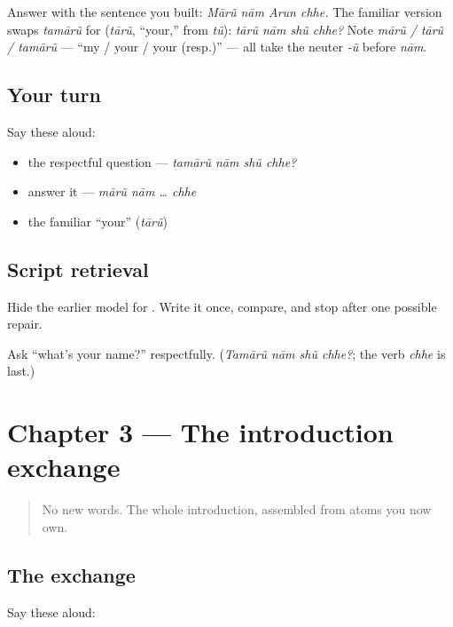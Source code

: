 \begin{grammarlens}[title={Grammar Lens: answering, and the familiar form}]
Answer with the sentence you built: \emph{Mārũ nām Arun chhe.} The familiar version swaps \emph{tamārũ} for \textbf{} (\emph{tārũ}, \textquotedblleft{}your,\textquotedblright{} from \emph{tũ}): \emph{tārũ nām shũ chhe?} Note \emph{mārũ / tārũ / tamārũ} — \textquotedblleft{}my / your / your (resp.)\textquotedblright{} — all take the neuter \emph{-ũ} before \emph{nām}.
\end{grammarlens}

\subsection*{Your turn}
Say these aloud:

\begin{itemize}
\raggedright
  \item the respectful question — \emph{tamārũ nām shũ chhe?}
  \item answer it — \emph{mārũ nām … chhe}
  \item the familiar \textquotedblleft{}your\textquotedblright{} (\emph{tārũ})
\end{itemize}

\subsection*{Script retrieval}
Hide the earlier model for \textbf{}. Write it once, compare, and stop after one possible repair.

\begin{tcolorbox}[breakable,colback=teal!4,colframe=teal!35!black,title={Before you move on}]
Ask \textquotedblleft{}what's your name?\textquotedblright{} respectfully. (\emph{Tamārũ nām shũ chhe?}; the verb \emph{chhe} is last.)
\end{tcolorbox}
\section[Practice]{Chapter 3 — The introduction exchange}

\label{lesson:GU-C02-practice}



\begin{quote}
No new words. The whole introduction, assembled from atoms you now own.
\end{quote}

\subsection*{The exchange}
Say these aloud:

